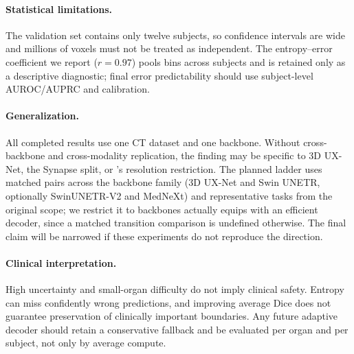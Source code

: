 \paragraph{Statistical limitations.}
The validation set contains only twelve subjects, so confidence intervals are
wide and millions of voxels must not be treated as independent.  The
entropy--error coefficient we report ($r=0.97$) pools bins across subjects and is
retained only as a descriptive diagnostic; final error predictability should use
subject-level AUROC/AUPRC and calibration.

\paragraph{Generalization.}
All completed results use one CT dataset and one backbone.  Without
cross-backbone and cross-modality replication, the finding may be specific to 3D
UX-Net, the Synapse split, or \method{}'s resolution restriction.  The planned
ladder uses matched pairs across the \method{} backbone family (3D UX-Net and
Swin UNETR, optionally SwinUNETR-V2 and MedNeXt) and representative tasks from
the original \method{} scope; we restrict it to backbones \method{} actually
equips with an efficient decoder, since a matched transition comparison is
undefined otherwise.  The final claim will be narrowed if these experiments do
not reproduce the direction.

\paragraph{Clinical interpretation.}
High uncertainty and small-organ difficulty do not imply clinical safety.
Entropy can miss confidently wrong predictions, and improving average Dice does
not guarantee preservation of clinically important boundaries.  Any future
adaptive decoder should retain a conservative fallback and be evaluated per organ
and per subject, not only by average compute.
